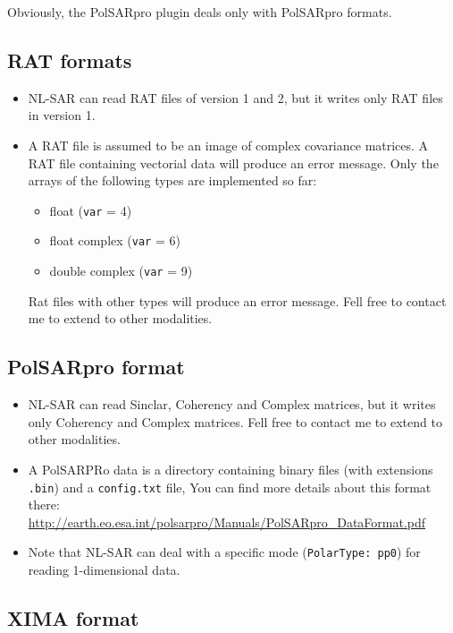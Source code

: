 \documentclass[10pt,french,english,a4paper]{article}
\begin{document}
Obviously, the PolSARpro plugin deals only with PolSARpro formats.

\subsection{RAT formats}

\begin{itemize}
\item
  NL-SAR can read RAT files of version 1 and 2, but it writes only RAT files in version 1.
\item
  A RAT file is assumed to be an image of complex covariance matrices.
  A RAT file containing vectorial data will produce an error message.
  Only the arrays of the following types are implemented so far:
  \begin{itemize}
    \item float (\texttt{var} = 4)
    \item float complex (\texttt{var} = 6)
    \item double complex (\texttt{var} = 9)
  \end{itemize}
  Rat files with other types will produce an error message.
  Fell free to contact me to extend to other modalities.
\end{itemize}

\subsection{PolSARpro format}


\begin{itemize}
\item
  NL-SAR can read Sinclar, Coherency and Complex matrices,
  but it writes only Coherency and Complex matrices.
  Fell free to contact me to extend to other modalities.
\item
  A PolSARPRo data is a directory containing binary files (with extensions \texttt{.bin})
  and a \texttt{config.txt} file,
  You can find more details about this format there:
  \url{http://earth.eo.esa.int/polsarpro/Manuals/PolSARpro_DataFormat.pdf}
\item
  Note that NL-SAR can deal with a specific mode (\texttt{PolarType:~pp0})
  for reading 1-dimensional data.
\end{itemize}

\subsection{XIMA format}
\end{document}
